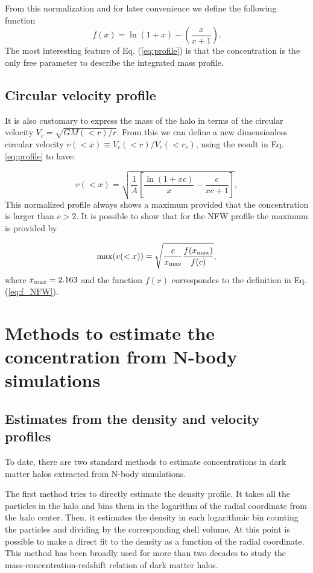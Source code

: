 \documentclass[a4,useAMS,usenatbib,usegraphicx]{mn2e}
\begin{document}
From this normalization and for later convenience we define the
following function
%
\begin{equation}
f(x) = \ln\left(1+x\right)-\left(\frac{x}{x+1}\right).
\label{eq:f_NFW}
\end{equation}
%
The most interesting feature of Eq. (\ref{eq:profile}) is that the
concentration is the only free parameter to describe the integrated
mass profile.
 
\subsection{Circular velocity profile}

It is also customary to express the mass of the halo in terms of the
circular velocity $V_{c}=\sqrt{GM(<r)/r}$.
From this we can define a new dimensionless circular velocity $v(<x)\equiv
V_{c}(<r)/V_{c}(<r_v)$, using the result in Eq. \ref{eq:profile}
to have:

\begin{equation}
v(<x)=\sqrt{\frac{1}{A}\left[\frac{\ln\left(1+xc\right)}{x}-\frac{c}{xc+1}\right]},
\end{equation}
%
This normalized profile always shows a maximum provided that the
concentration is larger than $c>2$.
It is possible to show that for the NFW profile the maximum is
provided by

\begin{equation}
\mathrm{max}(v(<x)) = \sqrt{\frac{c}{x_{\rm max}}\frac{f(x_{\rm
      max})}{f(c)}},
\label{eq:max_v}
\end{equation}
where $x_{\rm max}=2.163$ \citep{Klypin2014} and the function $f(x)$
correspondes to the definition in Eq. (\ref{eq:f_NFW}).

\section{Methods to estimate the concentration from N-body simulations}
\label{sec:method}

\subsection{Estimates from the density and velocity profiles}

To date, there are two standard methods to estimate concentrations in
dark matter halos extracted from N-body simulations. 

The first method tries to directly estimate the density profile.  
It takes all the particles in the halo and bins them in the logarithm of
the radial coordinate from the halo center.  
Then, it estimates the density in each logarithmic bin counting the
particles and dividing by the corresponding shell volume.  
At this point is possible to make a direct fit to the density as a
function of the radial coordinate. 
This method has been broadly used for more than two decades to study
the mass-concentration-redshift relation of dark matter halos.
 
\end{document}
